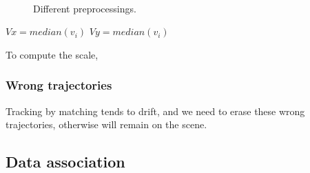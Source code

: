 \documentclass[12pt, a4paper, titlepage,twoside,openright]{article}
\begin{document}
\begin{figure}[H]
		
\centering

\\
\caption{Different preprocessings.}
\label{motion2}
\end{figure}




$ Vx = median(v_{i})$
$ Vy = median(v_{i})$


To compute the scale, 



\subsubsection{Wrong trajectories}

Tracking by matching tends to drift, and we need to erase these wrong trajectories, otherwise will remain on the scene.




\subsection{Data association}
\end{document}
